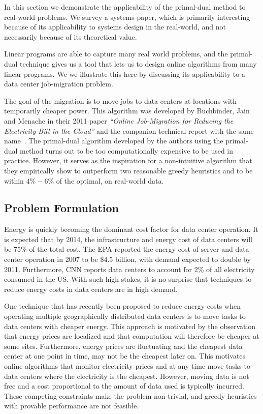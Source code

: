 In this section we demonstrate the applicability of the primal-dual method to real-world problems.
We survey a systems paper, which is primarily interesting because of its applicability to systems design in the real-world, and not necessarily because of its theoretical value.

Linear programs are able to capture many real world problems, and the primal-dual technique gives us a tool that lets us to design online algorithms from many linear programs.
We we illustrate this here by discussing its applicability to a data center job-migration problem.

The goal of the migration is to move jobs to data centers at locations with temporarily cheaper power.
This algorithm was developed by Buchbinder, Jain and Menache in their 2011 paper \emph{``Online Job-Migration for Reducing the Electricity Bill in the Cloud''} and the companion technical report with the same name~\cite{buchbinder11:job-migration,buchbinder11:job-migration-techreport}.
The primal-dual algorithm developed by the authors using the primal-dual method turns out to be too computationally expensive to be used in practice.
However, it serves as the inspiration for a non-intuitive algorithm that they empirically show to outperform two reasonable greedy heuristics and to be within $4\%-6\%$ of the optimal, on real-world data.

\subsection{Problem Formulation}

Energy is quickly becoming the dominant cost factor for data center operation.
It is expected that by 2014, the infrastructure and energy cost of data centers will be 75\% of the total cost.
The EPA reported the energy cost of server and data center operation in 2007 to be \$4.5 billion, with demand expected to double by 2011.
Furthermore, CNN reports data centers to account for 2\% of all electricity consumed in the US.
With such high stakes, it is no surprise that techniques to reduce energy costs in data centers are in high demand.

One technique that has recently been proposed to reduce energy costs when operating multiple geographically distributed data centers is to move tasks to data centers with cheaper energy.
This approach is motivated by the observation that energy prices are localized and that computation will therefore be cheaper at some sites.
Furthermore, energy prices are fluctuating and the cheapest data center at one point in time, may not be the cheapest later on.
This motivates online algorithms that monitor electricity prices and at any time move tasks to data centers where the electricity is the cheapest.
However, moving data is not free and a cost proportional to the amount of data used is typically incurred.
These competing constraints make the problem non-trivial, and greedy heuristics with provable performance are not feasible.

